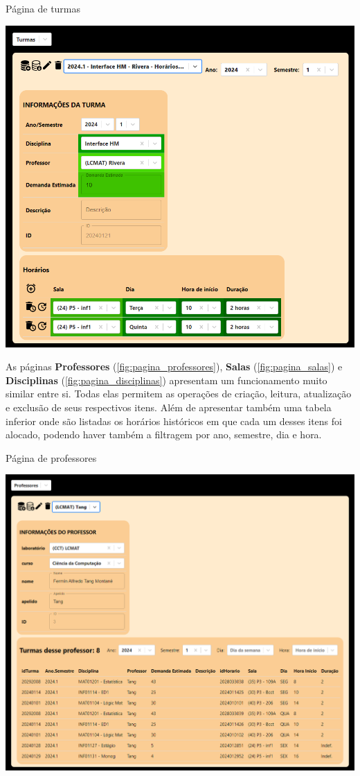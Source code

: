 \begin{MyCenteredFigure} \caption{Página de turmas} \label{fig:pagina_turmas}
  \includegraphics[width=\textwidth]{files/img/2.02!7-resultados/6-Turmas.png}
\end{MyCenteredFigure}

As páginas \textbf{Professores} (\autoref{fig:pagina_professores}), \textbf{Salas} (\autoref{fig:pagina_salas}) e \textbf{Disciplinas} (\autoref{fig:pagina_disciplinas}) apresentam um funcionamento muito similar entre si. Todas elas permitem as operações de criação, leitura, atualização e exclusão de seus respectivos itens. Além de apresentar também uma tabela inferior onde são listadas os horários históricos em que cada um desses itens foi alocado, podendo haver também a filtragem por ano, semestre, dia e hora.

\begin{MyCenteredFigure} \caption{Página de professores} \label{fig:pagina_professores}
  \includegraphics[width=\textwidth]{files/img/2.02!7-resultados/7-Professores.png}
\end{MyCenteredFigure}

